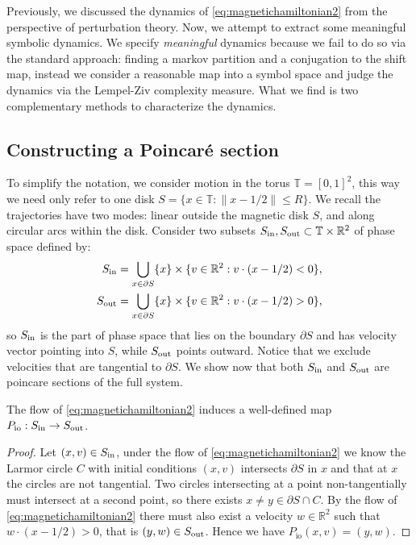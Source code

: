 
Previously, we discussed the dynamics of \eqref{eq:magnetichamiltonian2} from the perspective of perturbation theory. Now, we attempt to extract some meaningful symbolic dynamics. We specify \textit{meaningful} dynamics because we fail to do so via the standard approach: finding a markov partition and a conjugation to the shift map, instead we consider a reasonable map into a symbol space and judge the dynamics via the Lempel-Ziv complexity measure. What we find is two complementary methods to characterize the dynamics.

\subsection{Constructing a Poincar\'e section}

To simplify the notation, we consider motion in the torus $\mathbb T=[0,1]^2$, this way we need only refer to one disk $S= \{x\in \mathbb T : \|x-1/2\|\le R\}$. We recall the trajectories have two modes: linear outside the magnetic disk $S$, and along circular arcs within the disk. Consider two subsets $S_\text{in},S_\text{out}\subset \mathbb T\times\mathbb R^2$ of phase space defined by:
\begin{align}
\label{def:poincaresectionIN}
S_\text{in} &= \bigcup_{x\in\partial S} \{x\} \times \{v\in\mathbb R^2 : v\cdot (x-1/2) < 0\},\\
\label{def:poincaresectionOUT}
S_\text{out} &= \bigcup_{x\in\partial S} \{x\} \times \{v\in\mathbb R^2 : v\cdot (x-1/2) > 0\},
\end{align}
so $S_\text{in}$ is the part of phase space that lies on the boundary $\partial S$ and has velocity vector pointing into $S$, while $S_\text{out}$ points outward. Notice that we exclude velocities that are tangential to $\partial S$. We show now that both $S_\text{in}$ and $S_\text{out}$ are poincare sections of the full system.

\begin{lemma}
The flow of \eqref{eq:magnetichamiltonian2} induces a well-defined map $P_\text{io}:S_\text{in}\to S_\text{out}$.
\end{lemma}
\begin{proof}
Let $(x,v)\in S_\text{in}$, under the flow of \eqref{eq:magnetichamiltonian2} we know the Larmor circle $C$ with initial conditions $(x,v)$ intersects $\partial S$ in $x$ and that at $x$ the circles are not tangential. Two circles intersecting at a point non-tangentially must intersect at a second point, so there exists $x\neq y\in\partial S\cap C$. By the flow of \eqref{eq:magnetichamiltonian2} there must also exist a velocity $w\in\mathbb R^2$ such that $w\cdot(x-1/2)>0$, that is $(y,w)\in S_\text{out}$. Hence we have $P_\text{io}(x,v) = (y,w)$. 
\end{proof}

